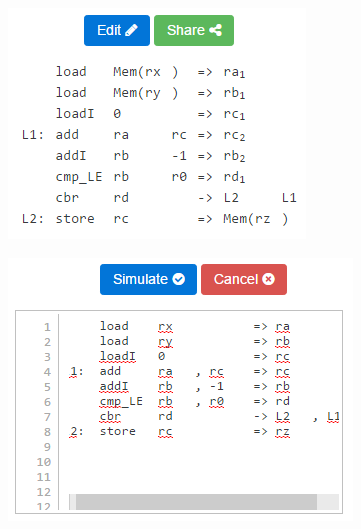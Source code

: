 \documentclass[bsc,twoside,singlespacing,parskip,logo,notimes,normalheadings]{infthesis}
\begin{document}
        \begin{figure}[!ht]
          \hspace{2mm}
          \begin{minipage}{.48\textwidth}
            \includegraphics[width=\textwidth, trim=-15 -35 -15 0]{img/codedisplay.png}
            \captionsetup{width=\textwidth, justification=centering}
            \label{fig:code-display}
          \end{minipage}%
          \quad
          \begin{minipage}{.48\textwidth}
            \includegraphics[width=\textwidth]{img/codeedit.png}
            \captionsetup{width=\textwidth, justification=centering}
            \label{fig:code-edit}
          \end{minipage}
        \end{figure}
\end{document}
